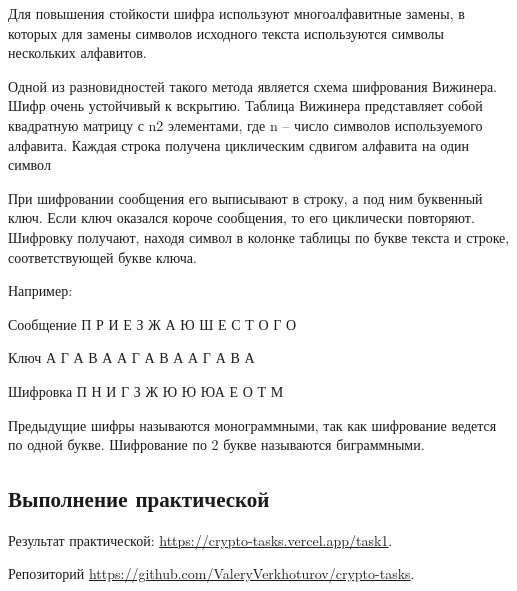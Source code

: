 Для повышения стойкости шифра используют многоалфавитные замены,
в которых для замены символов исходного текста используются символы
нескольких алфавитов.

Одной из разновидностей такого метода является схема шифрования
Вижинера. Шифр очень устойчивый к вскрытию. Таблица Вижинера
представляет собой квадратную матрицу с n2 элементами, где n – число
символов используемого алфавита. Каждая строка получена циклическим
сдвигом алфавита на один символ

При шифровании сообщения его выписывают в строку, а под ним
буквенный ключ. Если ключ оказался короче сообщения, то его циклически
повторяют. Шифровку получают, находя символ в колонке таблицы по букве
текста и строке, соответствующей букве ключа.

Например:

Сообщение П Р И Е З Ж А Ю Ш Е С Т О Г О

Ключ А Г А В А А Г А В А А Г А В А

Шифровка П Н И Г З Ж Ю Ю ЮА Е О Т М

Предыдущие шифры называются монограммными, так как шифрование ведется по одной букве. Шифрование по 2 букве называются биграммными.

\subsection{Выполнение практической}

Результат практической: \url{https://crypto-tasks.vercel.app/task1}.

Репозиторий \url{https://github.com/ValeryVerkhoturov/crypto-tasks}.


